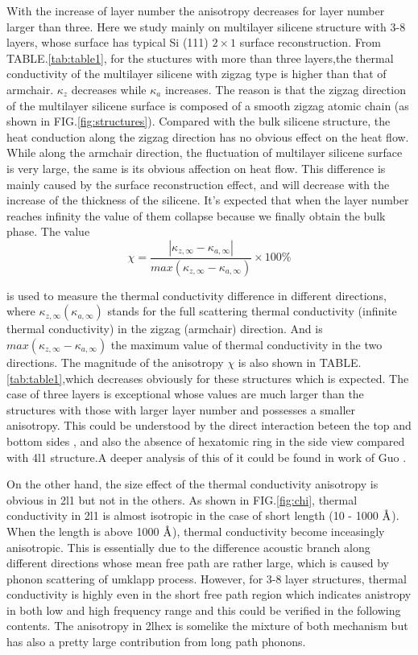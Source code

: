 \documentclass[%
 reprint,
 amsmath,amssymb,
 aps,
 prb,
]{revtex4-1}
\newcommand{\angstrom}{\mbox{\normalfont\AA}}
\begin{document}
With the increase of layer number the anisotropy decreases for layer number larger than three. Here we study mainly on multilayer silicene structure with 3-8 layers, whose  surface has typical Si (111) $2 \times 1$ surface reconstruction.   From TABLE.\ref{tab:table1}, for the stuctures with more than three layers,the thermal conductivity of the multilayer silicene with zigzag type is higher than that of armchair. $\kappa_z$ decreases while $\kappa_a$ increases. The reason is that the zigzag direction of the multilayer silicene surface is composed of a smooth zigzag atomic chain (as shown in FIG.\ref{fig:structures}). Compared with the bulk silicene structure, the heat conduction along the zigzag direction has no obvious effect on the heat flow. While along the armchair direction, the fluctuation of multilayer silicene surface is very large, the same is its obvious affection on heat flow. This difference is mainly caused by the surface reconstruction effect, and will decrease with the increase of the thickness of the silicene. It's expected that when the layer number reaches infinity the value of them collapse because we finally obtain the bulk phase. The value
\begin{equation}
  \chi=\frac{|\kappa_{z,\infty}-\kappa_{a,\infty} |}{ max⁡(\kappa_{z,\infty}-\kappa_{a,\infty} ) } \times 100 \%  \label{eq:eq_chi}
\end{equation}

is used to measure the thermal conductivity difference in different directions, where $ \kappa_{z,\infty} (\kappa_{a,\infty})$ stands for the full scattering thermal conductivity (infinite thermal conductivity) in the zigzag (armchair) direction. And is $ max⁡(\kappa_{z,\infty}-\kappa_{a,\infty} ) $ the maximum value of thermal conductivity in the two directions. The magnitude of the anisotropy $\chi$ is also shown in TABLE.\ref{tab:table1},which  decreases obviously for these structures which is expected. The case of three layers is exceptional whose values are much larger than the structures with those with larger layer number and possesses a smaller anisotropy. This could be understood by the direct interaction beteen the top and bottom sides , and also the absence of hexatomic ring in the side view compared with 4l1 structure.A deeper analysis of this of it could be found in work of Guo \cite{Guo2015Structural}.


On the other hand, the size effect of the thermal conductivity anisotropy is obvious in 2l1 but not in the others. As shown in FIG.\ref{fig:chi}, thermal conductivity in 2l1 is almost isotropic  in the case of short length (10 - 1000 $\angstrom$). When the length is above 1000  $\angstrom$), thermal conductivity become inceasingly anisotropic. This is essentially due to the difference acoustic branch along different directions whose mean free path are rather large, which is caused by phonon scattering of umklapp process. However, for 3-8 layer structures, thermal conductivity is highly even in the short free path region which indicates anistropy in both low and high frequency range and this could  be verified in the following contents. The anisotropy in 2lhex is somelike the mixture of both mechanism but has also a pretty large contribution from long path phonons.
\end{document}
